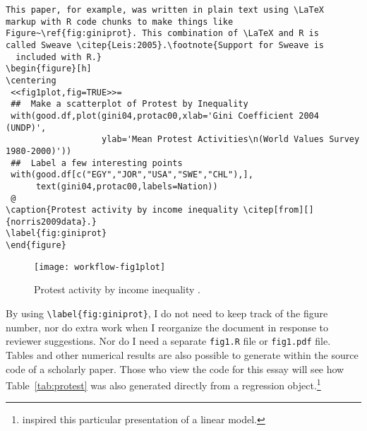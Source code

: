 \documentclass[12pt]{article}
\begin{document}
\begin{Verbatim}[fontsize=\footnotesize]
This paper, for example, was written in plain text using \LaTeX
markup with R code chunks to make things like
Figure~\ref{fig:giniprot}. This combination of \LaTeX and R is
called Sweave \citep{Leis:2005}.\footnote{Support for Sweave is
  included with R.}
\begin{figure}[h]
\centering
 <<fig1plot,fig=TRUE>>=
 ##  Make a scatterplot of Protest by Inequality
 with(good.df,plot(gini04,protac00,xlab='Gini Coefficient 2004 (UNDP)',
                   ylab='Mean Protest Activities\n(World Values Survey 1980-2000)'))
 ##  Label a few interesting points
 with(good.df[c("EGY","JOR","USA","SWE","CHL"),],
      text(gini04,protac00,labels=Nation))
 @
\caption{Protest activity by income inequality \citep[from][]{norris2009data}.}
\label{fig:giniprot}
\end{figure}
\end{Verbatim}


\begin{figure}[H]
  \begin{center}
\texttt{[image: workflow-fig1plot]}
    \caption{Protest activity by income inequality \citep[from][]{norris2009data}.}
    \label{fig:giniprot}
  \end{center}
\end{figure}


By using \Verb+\label{fig:giniprot}+, I do not need to keep track of
the figure number, nor do extra work when I reorganize the document in
response to reviewer suggestions. Nor do I need a separate
\Verb+fig1.R+ file or \Verb+fig1.pdf+ file.  Tables and other
numerical results are also possible to generate within the source
code of a scholarly paper. Those who view the code for this essay will
see how Table~\ref{tab:protest} was also generated directly from a
regression object.\footnote{\citet{beck2010reg} inspired this
  particular presentation of a linear model.}
\end{document}

